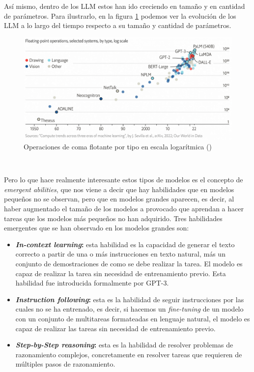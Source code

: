 Así mismo, dentro de los LLM estos han ido creciendo en tamaño y en cantidad de parámetros.
Para ilustrarlo, en la figura \ref{fig:evolutionLLM} podemos ver la evolución de los LLM a lo largo
del tiempo respecto a su tamaño y cantidad de parámetros.

\begin{figure}[H]
    \begin{center}
      \includegraphics[width=15cm]{figuras/Capitulo_03/EvolutionLLM.png}
    \end{center}
    \caption[Operaciones de coma flotante por tipo en escala logarítmica]{Operaciones de coma flotante por tipo en escala logarítmica (\cite{EvolutionLLM})}
    \label{fig:evolutionLLM}
\end{figure}\

Pero lo que hace realmente interesante estos tipos de modelos es el concepto de
\textit{emergent abilities}, que nos viene a decir que hay habilidades que en
modelos pequeños no se observan, pero que en modelos grandes aparecen, es decir,
al haber augmentado el tamaño de los modelos a provocado que aprendan a hacer tareas
que los modelos más pequeños no han adquirido. Tres habilidades emergentes que se
han observado en los modelos grandes son:

\begin{itemize}
    \item \textbf{\textit{In-context learning}:} esta habilidad es la capacidad
        de generar el texto correcto a partir de una o más instrucciones en texto
        natural, más un conjunto de demostraciones de como se debe realizar la tarea.
        El modelo es capaz de realizar la tarea sin necesidad de entrenamiento previo.
        Esta habilidad fue introducida formalmente por GPT-3.
    \item \textbf{\textit{Instruction following}:} esta es la habilidad de seguir
        instrucciones por las cuales no se ha entrenado, es decir, si hacemos un
        \textit{fine-tuning} de un modelo con un conjunto de multitareas formateadas en
        lenguaje natural, el modelo es capaz de realizar las tareas sin necesidad de
        entrenamiento previo.
    \item \textbf{\textit{Step-by-Step reasoning}:} esta es la habilidad de resolver
        problemas de razonamiento complejos, concretamente en resolver tareas que
        requieren de múltiples pasos de razonamiento.
\end{itemize}

